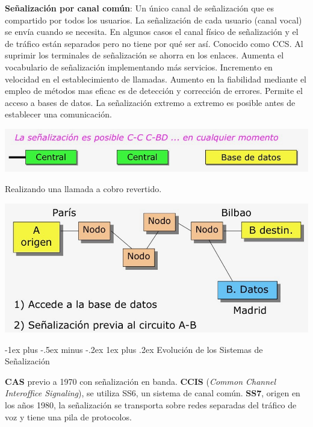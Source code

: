 \documentclass[10pt,portrait, twocolumn]{article}
\makeatletter
\renewcommand{\subsubsection}{\@startsection{subsubsection}{3}{0mm}%
                                {-1ex plus -.5ex minus -.2ex}%
                                {1ex plus .2ex}%
                                {\normalfont\small\bfseries}}
\makeatother
\begin{document}
\textbf{Señalización por canal común}: Un único canal de señalización que es compartido por todos los usuarios. La señalización de cada usuario (canal vocal) se envía cuando se necesita. En algunos casos el canal físico de señalización y el de tráfico están separados pero no tiene por qué ser así. Conocido como CCS. Al suprimir los terminales de señalización se ahorra en los enlaces. Aumenta el vocabulario de señalización implementando más servicios. Incremento en velocidad en el establecimiento de llamadas. Aumento en la fiabilidad mediante el empleo de métodos mas eficac es de detección y corrección de errores. Permite el acceso a bases de datos. La señalización extremo a extremo es posible antes de establecer una comunicación.

	\begin{center}
		\includegraphics[scale = 0.2]{SenalizacionComun}
	\end{center}

Realizando una llamada a cobro revertido.

	\begin{center}
		\includegraphics[scale = 0.2]{CobroRevertido}
	\end{center}


\subsubsection{Evolución de los Sistemas de Señalización}

\textbf{CAS} previo a 1970 con señalización en banda. \textbf{CCIS} (\textit{Common Channel Interoffice Signaling}), se utiliza SS6, un sistema de canal común. \textbf{SS7}, origen en los años 1980, la señalización se transporta sobre redes separadas del tráfico de voz y tiene una pila de protocolos.
\end{document}
